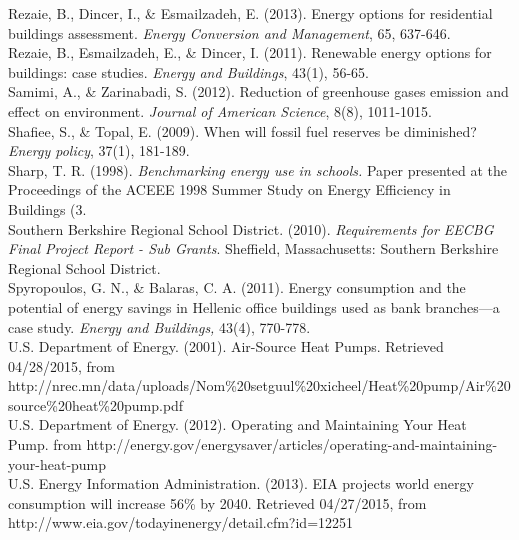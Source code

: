 \hangindent=0.5in
Rezaie, B., Dincer, I., \& Esmailzadeh, E. (2013). Energy options for residential buildings assessment. \emph{Energy Conversion and Management}, 65, 637-646. \\

\hangindent=0.5in
Rezaie, B., Esmailzadeh, E., \& Dincer, I. (2011). Renewable energy options for buildings: case studies. \emph{Energy and Buildings}, 43(1), 56-65. \\

\hangindent=0.5in
Samimi, A., \& Zarinabadi, S. (2012). Reduction of greenhouse gases emission and effect on environment. \emph{Journal of American Science}, 8(8), 1011-1015. \\

\hangindent=0.5in
Shafiee, S., \& Topal, E. (2009). When will fossil fuel reserves be diminished? \emph{Energy policy}, 37(1), 181-189. \\

\hangindent=0.5in
Sharp, T. R. (1998). \emph{Benchmarking energy use in schools.} Paper presented at the Proceedings of the ACEEE 1998 Summer Study on Energy Efficiency in Buildings (3. \\

\hangindent=0.5in
Southern Berkshire Regional School District. (2010). \emph{Requirements for EECBG Final Project Report - Sub Grants}. Sheffield, Massachusetts: Southern Berkshire Regional School District. \\

\hangindent=0.5in
Spyropoulos, G. N., \& Balaras, C. A. (2011). Energy consumption and the potential of energy savings in Hellenic office buildings used as bank branches—a case study. \emph{Energy and Buildings,} 43(4), 770-778. \\

\hangindent=0.5in
U.S. Department of Energy. (2001). Air-Source Heat Pumps. Retrieved 04\slash 28\slash 2015, from http:\slash \slash nrec.mn\slash data\slash uploads\slash Nom\%20setguul\%20xicheel\slash Heat\%20pump\slash Air\%20source\%20heat\%20pump.pdf \\

\hangindent=0.5in
U.S. Department of Energy. (2012). Operating and Maintaining Your Heat Pump. from http:\slash \slash energy.gov\slash energysaver\slash articles\slash operating-and-maintaining-your-heat-pump \\

\hangindent=0.5in
U.S. Energy Information Administration. (2013). EIA projects world energy consumption will increase 56\% by 2040. Retrieved 04\slash 27\slash 2015, from http:\slash \slash www.eia.gov\slash todayinenergy\slash detail.cfm?id=12251 \\

